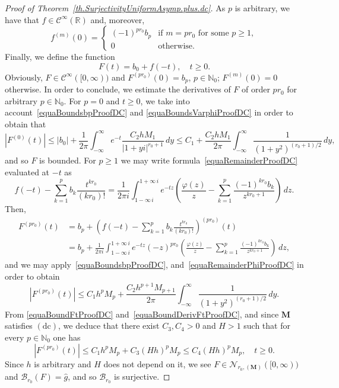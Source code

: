 \documentclass[11pt,a4paper]{article}
\theoremstyle{plain}
\theoremstyle{definition}
\numberwithin{equation}{section}
\newcommand{\N}{\mathbb{N}}
\newcommand{\R}{\mathbb{R}}
\newcommand{\M}{{\boldsymbol{M}}}
\newcommand{\dc}{\operatorname{(dc)}}
\begin{document}
\begin{proof}[Proof of Theorem~\ref{th.SurjectivityUniformAsymp.plus.dc}]
As $p$ is arbitrary, we have that $f\in\mathcal{C}^{\infty}(\R)$ and, moreover,
$$
f^{(m)}(0)=\begin{cases}
  (-1)^{pr_0}b_p&\textrm{if $m=pr_0$ for some $p\ge 1$},\\
  0&\textrm{otherwise.}
\end{cases}
$$
Finally, we define the function
$$
F(t)=b_0+f(-t),\quad t\ge 0.
$$
Obviously, $F\in\mathcal{C}^{\infty}([0,\infty))$ and
$F^{(pr_0)}(0)=b_p$, $p\in\N_0$; $F^{(m)}(0)=0$ otherwise.
In order to conclude, we estimate the derivatives of $F$ of order $pr_0$ for arbitrary $p\in\N_0$. For $p=0$ and $t\ge 0$, we take into account~\eqref{equaBoundsbpProofDC} and \eqref{equaBoundsVarphiProofDC} in order to obtain that
\begin{equation}\label{equaBoundFtProofDC}
|F^{(0)}(t)|\le |b_0|+\frac{1}{2\pi}\int_{-\infty}^{\infty}e^{-t}
\frac{C_2hM_{1}}{|1+yi|^{r_0+1}}\,dy\le
C_1+\frac{C_2hM_1}{2\pi}
\int_{-\infty}^{\infty}\frac{1}{(1+y^2)^{(r_0+1)/2}}\,dy,
\end{equation}
and so $F$ is bounded.
For $p\ge 1$ we may write formula~\eqref{equaRemainderProofDC}  evaluated at $-t$ as
\begin{equation*}
f(-t)-\sum_{k=1}^{p}b_k\frac{t^{kr_0}}{(kr_0)!}=
\frac{1}{2\pi i}\int_{1-\infty\,i}^{1+\infty\,i}e^{-tz}
\left(\frac{\varphi(z)}{z}- \sum_{k=1}^{p}\frac{(-1)^{kr_0}b_k}{z^{kr_0+1}}\right)\,dz.
\end{equation*}
Then,
\begin{align*}
F^{(pr_0)}(t)&=b_p+\left(f(-t)- \sum_{k=1}^{p}b_k\frac{t^{kr_0}}{(kr_0)!}\right)^{(pr_0)}(t)\\
&=
b_p+\frac{1}{2\pi i}\int_{1-\infty\,i}^{1+\infty\,i}e^{-tz}
(-z)^{pr_0}\left(\frac{\varphi(z)}{z}- \sum_{k=1}^{p}\frac{(-1)^{kr_0}b_k}{z^{kr_0+1}}\right)\,dz,
\end{align*}
and we may apply~\eqref{equaBoundsbpProofDC}, and~\eqref{equaRemainderPhiProofDC} in order to obtain
\begin{equation}\label{equaBoundDerivFtProofDC}
|F^{(pr_0)}(t)|\le C_1h^pM_p+\frac{C_2h^{p+1}M_{p+1}}{2\pi} \int_{-\infty}^{\infty}\frac{1}{(1+y^2)^{(r_0+1)/2}}\,dy.
\end{equation}
From \eqref{equaBoundFtProofDC} and~\eqref{equaBoundDerivFtProofDC}, and since $\M$ satisfies $\dc$, we deduce that there exist $C_3,C_4>0$ and $H>1$ such that for every $p\in\N_0$ one has
$$
|F^{(pr_0)}(t)|\le C_1h^pM_p+C_3(Hh)^pM_p\le C_4(Hh)^pM_p,\quad t\ge 0.
$$
Since $h$ is arbitrary and $H$ does not depend on it, we see $F\in\mathcal{N}_{r_0,(\M)}([0,\infty))$ and $\mathcal{B}_{r_0}(F)=\widehat{g}$, and so $\mathcal{B}_{r_0}$ is surjective.
\end{proof}
\end{document}
